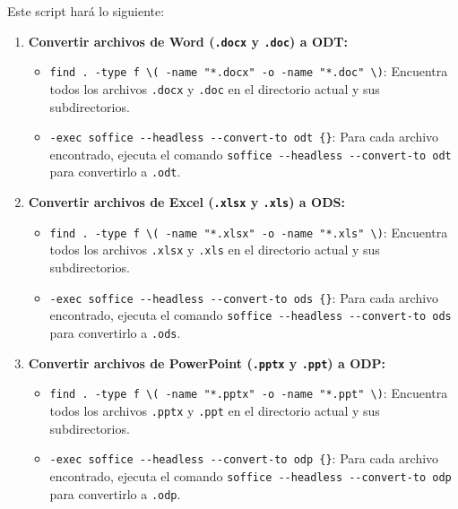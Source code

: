 \documentclass[
  jou,
  floatsintext,
  longtable,
  a4paper,
  nolmodern,
  notxfonts,
  notimes,
  colorlinks=true,linkcolor=blue,citecolor=blue,urlcolor=blue]{apa7}
\providecommand{\tightlist}{%
  \setlength{\itemsep}{0pt}\setlength{\parskip}{0pt}}
\begin{document}
Este script hará lo siguiente:

\begin{enumerate}
\def\labelenumi{\arabic{enumi}.}
\tightlist
\item
  \textbf{Convertir archivos de Word (\texttt{.docx} y \texttt{.doc}) a
  ODT:}

  \begin{itemize}
  \tightlist
  \item
    \texttt{find\ .\ -type\ f\ \textbackslash{}(\ -name\ "*.docx"\ -o\ -name\ "*.doc"\ \textbackslash{})}:
    Encuentra todos los archivos \texttt{.docx} y \texttt{.doc} en el
    directorio actual y sus subdirectorios.
  \item
    \texttt{-exec\ soffice\ -\/-headless\ -\/-convert-to\ odt\ \{\}}:
    Para cada archivo encontrado, ejecuta el comando
    \texttt{soffice\ -\/-headless\ -\/-convert-to\ odt} para convertirlo
    a \texttt{.odt}.
  \end{itemize}
\item
  \textbf{Convertir archivos de Excel (\texttt{.xlsx} y \texttt{.xls}) a
  ODS:}

  \begin{itemize}
  \tightlist
  \item
    \texttt{find\ .\ -type\ f\ \textbackslash{}(\ -name\ "*.xlsx"\ -o\ -name\ "*.xls"\ \textbackslash{})}:
    Encuentra todos los archivos \texttt{.xlsx} y \texttt{.xls} en el
    directorio actual y sus subdirectorios.
  \item
    \texttt{-exec\ soffice\ -\/-headless\ -\/-convert-to\ ods\ \{\}}:
    Para cada archivo encontrado, ejecuta el comando
    \texttt{soffice\ -\/-headless\ -\/-convert-to\ ods} para convertirlo
    a \texttt{.ods}.
  \end{itemize}
\item
  \textbf{Convertir archivos de PowerPoint (\texttt{.pptx} y
  \texttt{.ppt}) a ODP:}

  \begin{itemize}
  \tightlist
  \item
    \texttt{find\ .\ -type\ f\ \textbackslash{}(\ -name\ "*.pptx"\ -o\ -name\ "*.ppt"\ \textbackslash{})}:
    Encuentra todos los archivos \texttt{.pptx} y \texttt{.ppt} en el
    directorio actual y sus subdirectorios.
  \item
    \texttt{-exec\ soffice\ -\/-headless\ -\/-convert-to\ odp\ \{\}}:
    Para cada archivo encontrado, ejecuta el comando
    \texttt{soffice\ -\/-headless\ -\/-convert-to\ odp} para convertirlo
    a \texttt{.odp}.
  \end{itemize}
\end{enumerate}
\end{document}
